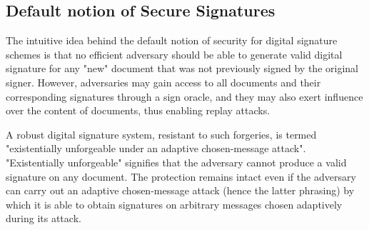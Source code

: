 \documentclass[]{final_report}
\theoremstyle{definition}
\begin{document}
\subsection{Default notion of Secure Signatures}
The intuitive idea behind the default notion of security for digital signature schemes is that no efficient adversary should be able to generate valid digital signature for any "new" document that was not previously signed by the original signer.
However, adversaries may gain access to all documents and their corresponding signatures through a sign oracle, and they may also exert influence over the content of documents, thus enabling replay attacks.

A robust digital signature system, resistant to such forgeries, is termed "existentially unforgeable under an adaptive chosen-message attack". "Existentially unforgeable" signifies that the adversary cannot produce a valid signature on any document. The protection  remains intact even if the adversary can carry out an adaptive chosen-message attack (hence the latter phrasing) by which it is able to obtain signatures on arbitrary messages chosen adaptively during its attack.
\end{document}
